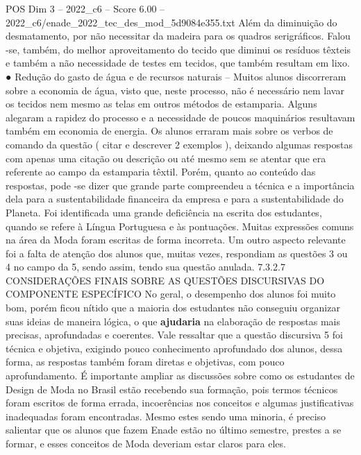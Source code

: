 \begin{textsample}{POS Dim 3 – 2022\_c6 – Score 6.00 – 2022\_c6/enade\_2022\_tec\_des\_mod\_5d9084e355.txt}
Além da diminuição do desmatamento, por não necessitar da madeira para os quadros serigráficos.
Falou -se, também, do melhor aproveitamento do tecido que diminui os resíduos têxteis e também a não necessidade de testes em tecidos, que também resultam em lixo. {\EmojiFont ●} Redução do gasto de água e de recursos naturais – Muitos alunos discorreram sobre a economia de água, visto que, neste processo, não é necessário nem lavar os tecidos nem mesmo as telas em outros métodos de estamparia.
Alguns alegaram a rapidez do processo e a necessidade de poucos maquinários resultavam também em economia de energia.
Os alunos erraram mais sobre os verbos de comando da questão ( citar e descrever 2 exemplos ), deixando algumas respostas com apenas uma citação ou descrição ou até mesmo sem se atentar que era referente ao campo da estamparia têxtil.
Porém, quanto ao conteúdo das respostas, pode -se dizer que grande parte compreendeu a técnica e a importância dela para a sustentabilidade financeira da empresa e para a sustentabilidade do Planeta.
Foi identificada uma grande deficiência na escrita dos estudantes, quando se refere à Língua Portuguesa e às pontuações.
Muitas expressões comuns na área da Moda foram escritas de forma incorreta.
Um outro aspecto relevante foi a falta de atenção dos alunos que, muitas vezes, respondiam as questões 3 ou 4 no campo da 5, sendo assim, tendo sua questão anulada. 7.3.2.7 CONSIDERAÇÕES FINAIS SOBRE AS QUESTÕES DISCURSIVAS DO COMPONENTE ESPECÍFICO No geral, o desempenho dos alunos foi muito bom, porém ficou nítido que a maioria dos estudantes não conseguiu organizar suas ideias de maneira lógica, o que \textbf{ajudaria} na elaboração de respostas mais precisas, aprofundadas e coerentes.
Vale ressaltar que a questão discursiva 5 foi técnica e objetiva, exigindo pouco conhecimento aprofundado dos alunos, dessa forma, as respostas também foram diretas e objetivas, com pouco aprofundamento.
É importante ampliar as discussões sobre como os estudantes de Design de Moda no Brasil estão recebendo sua formação, pois termos técnicos foram escritos de forma errada, incoerências nos conceitos e algumas justificativas inadequadas foram encontradas.
Mesmo estes sendo uma minoria, é preciso salientar que os alunos que fazem Enade estão no último semestre, prestes a se formar, e esses conceitos de Moda deveriam estar claros para eles.

\end{textsample}
